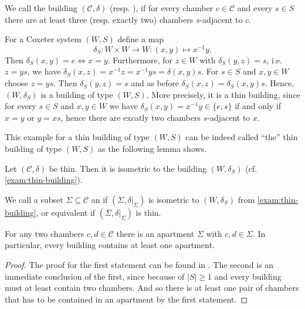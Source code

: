 \begin{defi}
	We call the building $(\mathcal{C}, \delta)$  (resp. ), if for every chamber $c \in \mathcal{C}$ and every $s \in S$ there are at least three (resp. exactly two) chambers $s$-adjacent to $c$.
\end{defi}

\begin{exam}
	For a Coxeter system $(W,S)$ define a map
	$$ \delta_S : W \times W \to W : (x,y) \mapsto x^{-1}y. $$
	Then $\delta_S(x,y) = e \iff x = y$. Furthermore, for $z \in W$ with $\delta_S(y,z) = s$, i.e.\ $z = ys$, we have $\delta_S(x,z) = x^{-1}z = x^{-1}ys = \delta(x,y)s$. For $s \in S$ and $x,y \in W$ choose $z = ys$. Then $\delta_S(y,z) = s$ and as before $\delta_S(x,z) = \delta_S(x,y)s$. Hence, $(W,\delta_S)$ is a building of type $(W,S)$. More precisely, it is a thin building, since for every $s \in S$ and $x,y \in W$ we have $\delta_S(x,y) = x^{-1}y \in \{e,s\}$ if and only if $x = y$ or $y = xs$, hence there are excatly two chambers $s$-adjacent to $x$.
\end{exam}

This example for a thin building of type $(W,S)$ can be indeed called ``the'' thin building of type $(W,S)$ as the following lemma shows.

\begin{theo}
	Let $(\mathcal{C}, \delta)$ be thin. Then it is isometric to the building $(W, \delta_S)$ (cf. \ref{exam:thin-building}).
\end{theo}

\begin{defi}
	We call a subset $\Sigma \subseteq \mathcal{C}$ an  if $(\Sigma, \delta|_\Sigma)$ is isometric to $(W,\delta_S)$ from \ref{exam:thin-building}, or equivalent if $(\Sigma, \delta|_\Sigma)$ is thin.
\end{defi}

\begin{theo}
	For any two chambers $c,d \in \mathcal{C}$ there is an apartment $\Sigma$ with $c,d \in \Sigma$. In particular, every building contains at least one apartment.

	\begin{proof}
		The proof for the first statement can be found in \cite[Theorem 11.2.5]{buekenhout:diagram-geometry}. The second is an immediate conclusion of the first, since because of $|S| \geq 1$ and  every building must at least contain two chambers. And so there is at least one pair of chambers that has to be contained in an apartment by the first statement.
	\end{proof}
\end{theo}

